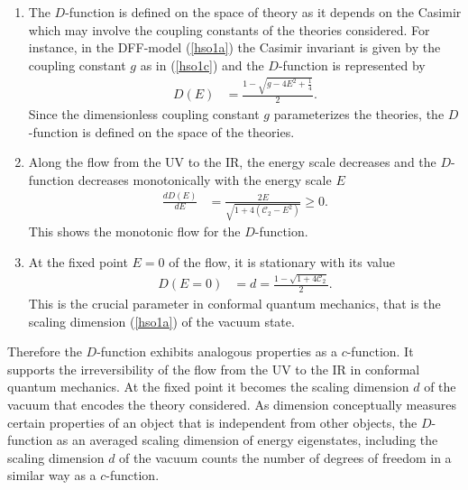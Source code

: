 \documentclass[12pt]{article}
\numberwithin{equation}{section}
\begin{document}
\begin{enumerate}
\item 
The $D$-function is defined on the space of theory 
as it depends on the Casimir which may involve the coupling constants of the theories considered. 
For instance, in the DFF-model (\ref{hso1a}) the Casimir invariant is given by the 
coupling constant $g$ as in (\ref{hso1c}) and the $D$-function is represented by 
\begin{align}
\label{dfn3a}
D(E)&=\frac{1-\sqrt{g-4E^{2}+\frac14}}{2}. 
\end{align}
Since the dimensionless coupling constant $g$ parameterizes the theories, 
the $D$-function is defined on the space of the theories. 

\item Along the flow from the UV to the IR, 
the energy scale decreases 
and the $D$-function decreases monotonically with the energy scale $E$
\begin{align}
\label{dfn3b}
\frac{dD(E)}{dE}
&=\frac{2E}{\sqrt{1+4(\mathcal{C}_{2}-E^{2})}}\ge 0.
\end{align}
This shows the monotonic flow for the $D$-function. 

\item At the fixed point $E=0$ of the flow, 
it is stationary with its value 
\begin{align}
\label{dfcn1b}
D(E=0)&=d=\frac{1-\sqrt{1+4\mathcal{C}_{2}}}{2}. 
\end{align}
This is the crucial parameter in conformal quantum mechanics, 
that is the scaling dimension (\ref{hso1a}) of the vacuum state. 
\end{enumerate}
%
Therefore the $D$-function exhibits analogous properties as a $c$-function.  
It supports the irreversibility of the flow from the UV to the IR 
in conformal quantum mechanics. 
At the fixed point it becomes the scaling dimension $d$ of the vacuum 
that encodes the theory considered.  
As dimension conceptually measures certain properties of an object 
that is independent from other objects, 
the $D$-function as an averaged scaling dimension of energy eigenstates, 
including the scaling dimension $d$ of the vacuum counts 
the number of degrees of freedom in a similar way as a $c$-function. 
\end{document}

